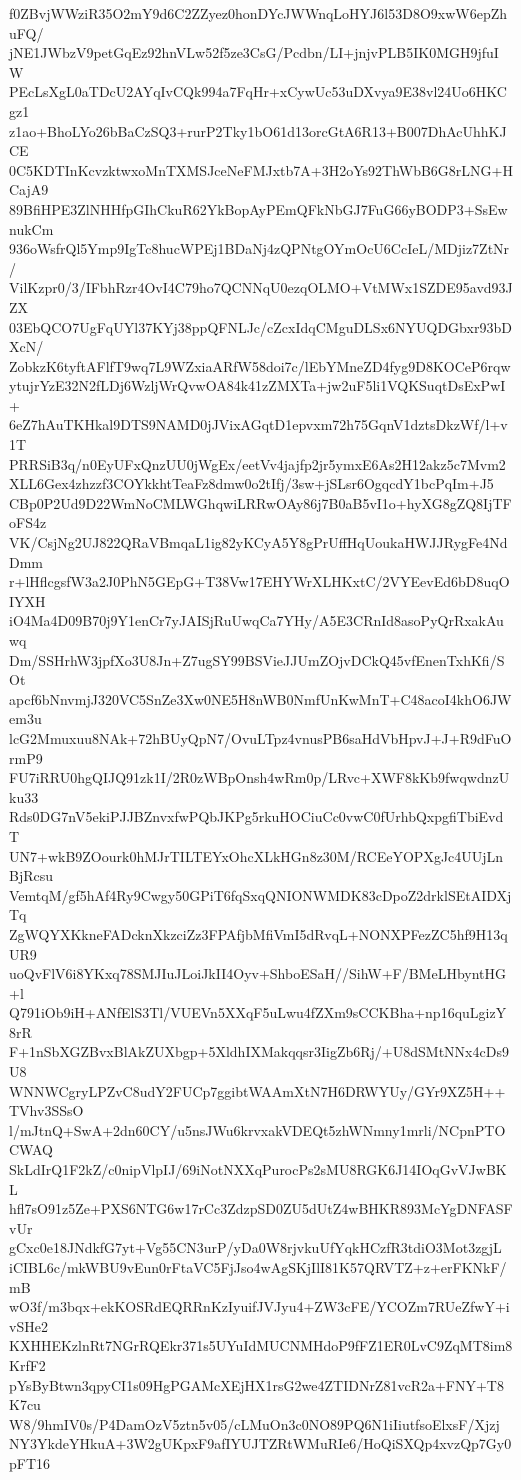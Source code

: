 f0ZBvjWWziR35O2mY9d6C2ZZyez0honDYcJWWnqLoHYJ6l53D8O9xwW6epZhuFQ/
jNE1JWbzV9petGqEz92hnVLw52f5ze3CsG/Pcdbn/LI+jnjvPLB5IK0MGH9jfuIW
PEcLsXgL0aTDcU2AYqIvCQk994a7FqHr+xCywUc53uDXvya9E38vl24Uo6HKCgz1
z1ao+BhoLYo26bBaCzSQ3+rurP2Tky1bO61d13orcGtA6R13+B007DhAcUhhKJCE
0C5KDTInKcvzktwxoMnTXMSJceNeFMJxtb7A+3H2oYs92ThWbB6G8rLNG+HCajA9
89BfiHPE3ZlNHHfpGIhCkuR62YkBopAyPEmQFkNbGJ7FuG66yBODP3+SsEwnukCm
936oWsfrQl5Ymp9IgTc8hucWPEj1BDaNj4zQPNtgOYmOcU6CcIeL/MDjiz7ZtNr/
VilKzpr0/3/IFbhRzr4OvI4C79ho7QCNNqU0ezqOLMO+VtMWx1SZDE95avd93JZX
03EbQCO7UgFqUYl37KYj38ppQFNLJc/cZcxIdqCMguDLSx6NYUQDGbxr93bDXcN/
ZobkzK6tyftAFlfT9wq7L9WZxiaARfW58doi7c/lEbYMneZD4fyg9D8KOCeP6rqw
ytujrYzE32N2fLDj6WzljWrQvwOA84k41zZMXTa+jw2uF5li1VQKSuqtDsExPwI+
6eZ7hAuTKHkal9DTS9NAMD0jJVixAGqtD1epvxm72h75GqnV1dztsDkzWf/l+v1T
PRRSiB3q/n0EyUFxQnzUU0jWgEx/eetVv4jajfp2jr5ymxE6As2H12akz5c7Mvm2
XLL6Gex4zhzzf3COYkkhtTeaFz8dmw0o2tIfj/3sw+jSLsr6OgqcdY1bcPqIm+J5
CBp0P2Ud9D22WmNoCMLWGhqwiLRRwOAy86j7B0aB5vI1o+hyXG8gZQ8IjTFoFS4z
VK/CsjNg2UJ822QRaVBmqaL1ig82yKCyA5Y8gPrUffHqUoukaHWJJRygFe4NdDmm
r+lHflcgsfW3a2J0PhN5GEpG+T38Vw17EHYWrXLHKxtC/2VYEevEd6bD8uqOIYXH
iO4Ma4D09B70j9Y1enCr7yJAISjRuUwqCa7YHy/A5E3CRnId8asoPyQrRxakAuwq
Dm/SSHrhW3jpfXo3U8Jn+Z7ugSY99BSVieJJUmZOjvDCkQ45vfEnenTxhKfi/SOt
apcf6bNnvmjJ320VC5SnZe3Xw0NE5H8nWB0NmfUnKwMnT+C48acoI4khO6JWem3u
lcG2Mmuxuu8NAk+72hBUyQpN7/OvuLTpz4vnusPB6saHdVbHpvJ+J+R9dFuOrmP9
FU7iRRU0hgQIJQ91zk1I/2R0zWBpOnsh4wRm0p/LRvc+XWF8kKb9fwqwdnzUku33
Rds0DG7nV5ekiPJJBZnvxfwPQbJKPg5rkuHOCiuCc0vwC0fUrhbQxpgfiTbiEvdT
UN7+wkB9ZOourk0hMJrTILTEYxOhcXLkHGn8z30M/RCEeYOPXgJc4UUjLnBjRcsu
VemtqM/gf5hAf4Ry9Cwgy50GPiT6fqSxqQNIONWMDK83cDpoZ2drklSEtAIDXjTq
ZgWQYXKkneFADcknXkzciZz3FPAfjbMfiVmI5dRvqL+NONXPFezZC5hf9H13qUR9
uoQvFlV6i8YKxq78SMJIuJLoiJkII4Oyv+ShboESaH//SihW+F/BMeLHbyntHG+l
Q791iOb9iH+ANfElS3Tl/VUEVn5XXqF5uLwu4fZXm9sCCKBha+np16quLgizY8rR
F+1nSbXGZBvxBlAkZUXbgp+5XldhIXMakqqsr3IigZb6Rj/+U8dSMtNNx4cDs9U8
WNNWCgryLPZvC8udY2FUCp7ggibtWAAmXtN7H6DRWYUy/GYr9XZ5H++TVhv3SSsO
l/mJtnQ+SwA+2dn60CY/u5nsJWu6krvxakVDEQt5zhWNmny1mrli/NCpnPTOCWAQ
SkLdIrQ1F2kZ/c0nipVlpIJ/69iNotNXXqPurocPs2sMU8RGK6J14IOqGvVJwBKL
hfl7sO91z5Ze+PXS6NTG6w17rCc3ZdzpSD0ZU5dUtZ4wBHKR893McYgDNFASFvUr
gCxc0e18JNdkfG7yt+Vg55CN3urP/yDa0W8rjvkuUfYqkHCzfR3tdiO3Mot3zgjL
iCIBL6c/mkWBU9vEun0rFtaVC5FjJso4wAgSKjIlI81K57QRVTZ+z+erFKNkF/mB
wO3f/m3bqx+ekKOSRdEQRRnKzIyuifJVJyu4+ZW3cFE/YCOZm7RUeZfwY+ivSHe2
KXHHEKzlnRt7NGrRQEkr371s5UYuIdMUCNMHdoP9fFZ1ER0LvC9ZqMT8im8KrfF2
pYsByBtwn3qpyCI1s09HgPGAMcXEjHX1rsG2we4ZTIDNrZ81vcR2a+FNY+T8K7cu
W8/9hmIV0s/P4DamOzV5ztn5v05/cLMuOn3c0NO89PQ6N1iIiutfsoElxsF/Xjzj
NY3YkdeYHkuA+3W2gUKpxF9afIYUJTZRtWMuRIe6/HoQiSXQp4xvzQp7Gy0pFT16
